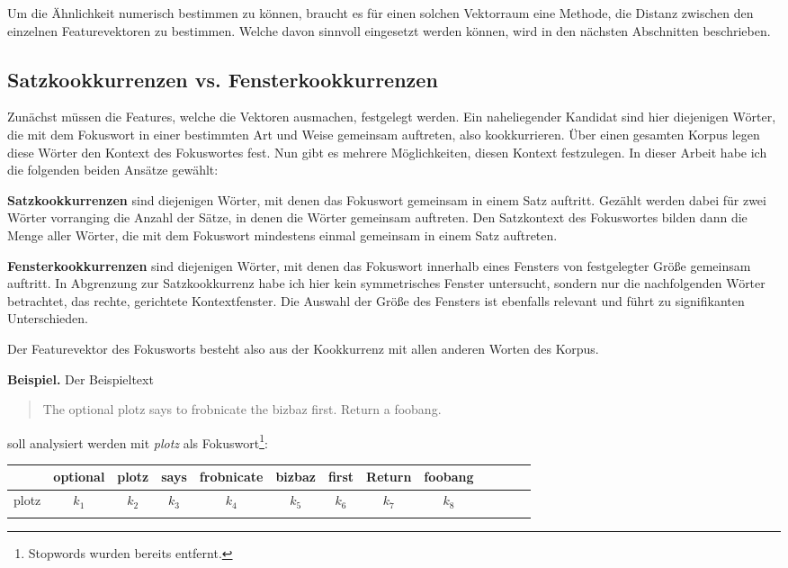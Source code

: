 \documentclass[11pt,numbers=noenddot]{scrartcl}
\begin{document}
Um die Ähnlichkeit numerisch bestimmen zu können, braucht es für einen solchen Vektorraum eine Methode, die Distanz zwischen den einzelnen Featurevektoren zu bestimmen. Welche davon sinnvoll eingesetzt werden können, wird in den nächsten Abschnitten beschrieben.

\subsection{Satzkookkurrenzen vs. Fensterkookkurrenzen}

Zunächst müssen die Features, welche die Vektoren ausmachen, festgelegt werden. Ein naheliegender Kandidat sind hier diejenigen Wörter, die mit dem Fokuswort in einer bestimmten Art und Weise gemeinsam auftreten, also kookkurrieren. Über einen gesamten Korpus legen diese Wörter den Kontext des Fokuswortes fest. Nun gibt es mehrere Möglichkeiten, diesen Kontext festzulegen. In dieser Arbeit habe ich die folgenden beiden Ansätze gewählt:

\textbf{Satzkookkurrenzen} sind diejenigen Wörter, mit denen das Fokuswort gemeinsam in einem Satz auftritt. Gezählt werden dabei für zwei Wörter vorranging die Anzahl der Sätze, in denen die Wörter gemeinsam auftreten. Den Satzkontext des Fokuswortes bilden dann die Menge aller Wörter, die mit dem Fokuswort mindestens einmal gemeinsam in einem Satz auftreten.

\textbf{Fensterkookkurrenzen} sind diejenigen Wörter, mit denen das Fokuswort innerhalb eines Fensters von festgelegter Größe gemeinsam auftritt. In Abgrenzung zur Satzkookkurrenz habe ich hier kein symmetrisches Fenster untersucht, sondern nur die nachfolgenden Wörter betrachtet, das rechte, gerichtete Kontextfenster. Die Auswahl der Größe des Fensters ist ebenfalls relevant und führt zu signifikanten Unterschieden.

Der Featurevektor des Fokusworts besteht also aus der Kookkurrenz mit allen anderen Worten des Korpus.

\textbf{Beispiel.} Der Beispieltext
\begin{quote}
    The optional plotz says to frobnicate the bizbaz first. Return a foobang.
\end{quote}
soll analysiert werden mit \emph{plotz} als Fokuswort\footnote{Stopwords wurden bereits entfernt.}:

\begin{table}[h]
    \begin{center}
        \begin{tabular}{ l | *{12}{c}}
                 & optional & plotz & says & frobnicate & bizbaz & first & Return & foobang \\ \hline
            plotz & $k_{1}$ & $k_{2}$ & $k_{3}$ & $k_{4}$ & $k_{5}$ & $k_{6}$ & $k_{7}$ & $k_{8}$ \\ \\
        \end{tabular}
    \end{center}
\end{table}
\end{document}
